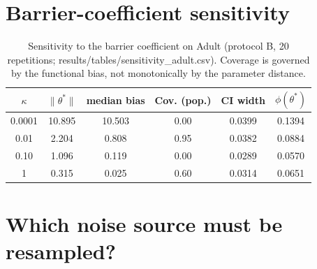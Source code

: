 \documentclass[11pt]{article}
\begin{document}
\begin{table}[h]
\centering
\small
\caption{Three-way variance budget (results/tables/variance_budget_*.json). The last two columns compare the average gap over re-sampled constraint sets with the actually reported gap, quantifying the $D'$ component.}
\label{tab:budget}
\end{table}

\section{Barrier-coefficient sensitivity}

\begin{table}[h]
\centering
\small
\caption{Sensitivity to the barrier coefficient on Adult (protocol B, 20 repetitions; results/tables/sensitivity_adult.csv). Coverage is governed by the functional bias, not monotonically by the parameter distance.}
\label{tab:kappa}
\begin{tabular}{cccccc}
\toprule
$\kappa$ & $\|\theta^*\|$ & median bias & Cov. (pop.) & CI width & $\phi(\theta^*)$ \\
\midrule
0.0001 & 10.895 & 10.503 & 0.00 & 0.0399 & 0.1394 \\
0.01 & 2.204 & 0.808 & 0.95 & 0.0382 & 0.0884 \\
0.10 & 1.096 & 0.119 & 0.00 & 0.0289 & 0.0570 \\
1 & 0.315 & 0.025 & 0.60 & 0.0314 & 0.0651 \\
\bottomrule
\end{tabular}
\end{table}

\section{Which noise source must be resampled?}
\end{document}
